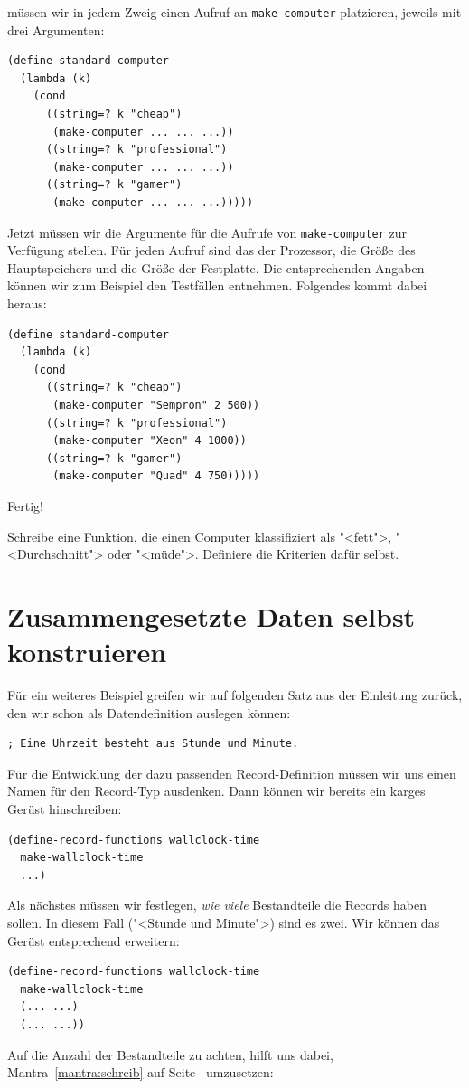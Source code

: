 müssen wir in jedem Zweig einen Aufruf an \texttt{make-computer}
platzieren, jeweils mit drei Argumenten:
%
\begin{verbatim}
(define standard-computer
  (lambda (k)
    (cond
      ((string=? k "cheap")
       (make-computer ... ... ...))
      ((string=? k "professional")
       (make-computer ... ... ...))
      ((string=? k "gamer")
       (make-computer ... ... ...)))))
\end{verbatim}
%
Jetzt müssen wir die Argumente für die Aufrufe von
\texttt{make-computer} zur Verfügung stellen.  Für jeden Aufruf sind
das der Prozessor, die Größe des Hauptspeichers und die
Größe der Festplatte.  Die entsprechenden Angaben können wir zum
Beispiel den Testfällen entnehmen.  Folgendes kommt dabei heraus:
%
\begin{verbatim}
(define standard-computer
  (lambda (k)
    (cond
      ((string=? k "cheap")
       (make-computer "Sempron" 2 500))
      ((string=? k "professional")
       (make-computer "Xeon" 4 1000))
      ((string=? k "gamer")
       (make-computer "Quad" 4 750)))))
\end{verbatim}
%
Fertig!

\begin{aufgabe}
  Schreibe eine Funktion, die einen Computer klassifiziert als
  "<fett">, "<Durchschnitt"> oder "<müde">.  Definiere die Kriterien
  dafür selbst.
\end{aufgabe}

\section{Zusammengesetzte Daten selbst konstruieren}

Für ein weiteres Beispiel greifen wir auf folgenden Satz aus der
Einleitung zurück, den wir schon als Datendefinition auslegen können:
%
\begin{verbatim}
; Eine Uhrzeit besteht aus Stunde und Minute.
\end{verbatim}
%
Für die Entwicklung der dazu passenden Record-Definition müssen wir
uns einen Namen für den Record-Typ ausdenken.  Dann können wir bereits
ein karges Gerüst hinschreiben:
%
\begin{verbatim}
(define-record-functions wallclock-time
  make-wallclock-time
  ...)
\end{verbatim}
%
Als nächstes müssen wir festlegen, \emph{wie viele} Bestandteile die
Records haben sollen.  In diesem Fall ("<Stunde und Minute">) sind es
zwei.  Wir können das Gerüst entsprechend erweitern:
%
\begin{verbatim}
(define-record-functions wallclock-time
  make-wallclock-time
  (... ...)
  (... ...))
\end{verbatim}
%
Auf die Anzahl der Bestandteile zu achten, hilft uns dabei, 
Mantra~\ref{mantra:schreib} auf Seite~\pageref{mantra:schreib}
umzusetzen:

